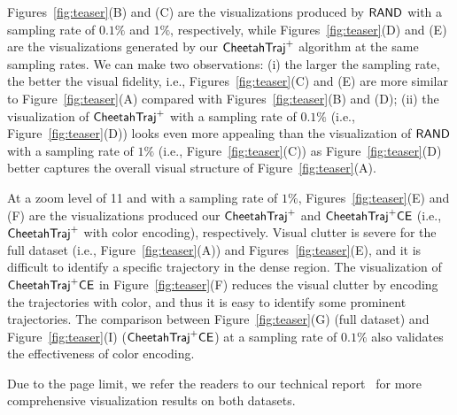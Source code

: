 
Figures~\ref{fig:teaser}(B) and (C) are the visualizations produced by $\mathsf{RAND}{}$ with a sampling rate of $0.1\%$ and $1\%$, respectively, while Figures~\ref{fig:teaser}(D) and (E) are the visualizations generated by our $\mathsf{CheetahTraj}^{+}{}$ algorithm at the same sampling rates. We can make two observations: (i) the larger the sampling rate, the better the visual fidelity, i.e., Figures~\ref{fig:teaser}(C) and (E) are more similar to Figure~\ref{fig:teaser}(A) compared with Figures~\ref{fig:teaser}(B) and (D); (ii) the visualization of $\mathsf{CheetahTraj}^{+}$ with a sampling rate of $0.1\%$ (i.e., Figure~\ref{fig:teaser}(D)) looks even more appealing than the visualization of $\mathsf{RAND}{}$ with a sampling rate of $1\%$ (i.e., Figure~\ref{fig:teaser}(C)) as Figure~\ref{fig:teaser}(D) better captures the overall visual structure of Figure~\ref{fig:teaser}(A).

At a zoom level of 11 and with a sampling rate of $1\%$, Figures~\ref{fig:teaser}(E) and (F) are the visualizations produced our $\mathsf{CheetahTraj}^{+}$ and $\mathsf{CheetahTraj}^{+}\mathsf{CE}$ (i.e., $\mathsf{CheetahTraj}^{+}$ with color encoding), respectively.
Visual clutter is severe for the full dataset (i.e., Figure~\ref{fig:teaser}(A)) and Figures~\ref{fig:teaser}(E), and it is difficult to identify a specific trajectory in the dense region. The visualization of $\mathsf{CheetahTraj}^{+}\mathsf{CE}$ in Figure~\ref{fig:teaser}(F) reduces the visual clutter by encoding the trajectories with color, and thus it is easy to identify some prominent trajectories. The comparison between Figure~\ref{fig:teaser}(G) (full dataset) and Figure~\ref{fig:teaser}(I)  ($\mathsf{CheetahTraj}^{+}\mathsf{CE}$) at a sampling rate of $0.1\%$ also validates the effectiveness of color encoding.

Due to the page limit, we refer the readers to our technical report~\cite{techreport} for more comprehensive visualization results on both datasets.

